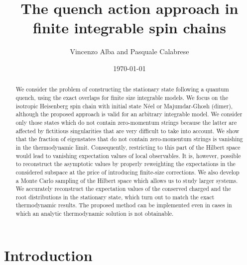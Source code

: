 \documentclass[11pt]{iopart}
\begin{document}
\setlength{\parindent}{0pt}


\title{The quench action approach in finite integrable spin chains}


\author{Vincenzo Alba and Pasquale Calabrese }
%
\address{$^1$\,SISSA and INFN, via Bonomea 265, 34136 Trieste, Italy. }




\date{\today}



\begin{abstract} 

We consider the problem of constructing the stationary state following a quantum quench, 
using the exact overlaps for finite size integrable models. 
We focus on the isotropic Heisenberg spin chain with initial state N\'eel or Majumdar-Ghosh (dimer),
although the proposed approach is valid for an arbitrary integrable model. 
We consider only those states which do not contain zero-momentum strings because the latter 
are affected by fictitious singularities that are very difficult to take into account. 
We show that the fraction of eigenstates that do not contain zero-momentum strings is vanishing in the thermodynamic limit.
Consequently, restricting to this part of the Hilbert space would lead to vanishing expectation values of local observables. 
It is, however, possible to reconstruct the asymptotic values by properly reweighting the expectations in the considered 
subspace at the price of introducing finite-size corrections. 
We also develop a Monte Carlo sampling of the Hilbert space which allows us to study larger systems. 
We accurately reconstruct the expectation values of the conserved charged and the root distributions in the stationary state, 
which turn out to match the exact thermodynamic results. 
The proposed method can be  implemented even in cases in which an analytic thermodynamic solution is not obtainable.

\end{abstract}

\maketitle

\section{Introduction}
\label{intro}
\end{document}
